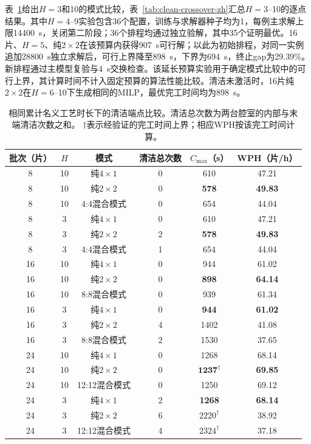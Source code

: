 \documentclass[final,5p,times,twocolumn]{elsarticle}
\begin{document}
表~\ref{tab:mode-extended-zh}给出$H=3$和10的模式比较，表~\ref{tab:clean-crossover-zh}汇总$H=3$--10的逐点结果。其中$H=4$--9实验包含36个配置，训练与求解器种子均为1，每例主求解上限14400~s，关闭第二阶段；36个排程均通过独立验解，其中35个证明最优。16片、$H=5$、纯$2\times2$在该预算内获得907~s可行解；以此为初始排程，对同一实例追加28800~s独立求解后，可行上界降至898~s，下界为694~s，终止gap为29.39\%。新排程通过主模型复验与4~s交换检查。该延长预算实验用于确定模式比较中的可行上界，其计算时间不计入固定预算的算法性能比较。清洁未激活时，16片纯$2\times2$在$H=6$--10下生成相同的MILP，最优完工时间均为898~s。

\begin{table}[!htbp]
\centering
\scriptsize
\setlength{\tabcolsep}{4pt}
\caption{相同累计名义工艺时长下的清洁端点比较。清洁总次数为两台腔室的内部与末端清洁次数之和。 $\dagger$表示经验证的完工时间上界；相应WPH按该完工时间计算。}
\label{tab:mode-extended-zh}
\begin{tabular}{cccccc}
\toprule
批次（片） & $H$ & 模式 & 清洁总次数 & $C_{\max}$（s） & WPH（片/h）\\
\midrule
8 & 10 & 纯$4\times1$ & 0 & 610 & 47.21\\
8 & 10 & 纯$2\times2$ & 0 & \textbf{578} & \textbf{49.83}\\
8 & 10 & 4:4混合模式 & 0 & 654 & 44.04\\
8 & 3 & 纯$4\times1$ & 0 & 610 & 47.21\\
8 & 3 & 纯$2\times2$ & 2 & \textbf{578} & \textbf{49.83}\\
8 & 3 & 4:4混合模式 & 1 & 654 & 44.04\\
\midrule
16 & 10 & 纯$4\times1$ & 0 & 944 & 61.02\\
16 & 10 & 纯$2\times2$ & 0 & \textbf{898} & \textbf{64.14}\\
16 & 10 & 8:8混合模式 & 0 & 939 & 61.34\\
16 & 3 & 纯$4\times1$ & 0 & \textbf{944} & \textbf{61.02}\\
16 & 3 & 纯$2\times2$ & 4 & 1402 & 41.08\\
16 & 3 & 8:8混合模式 & 2 & 1530 & 37.65\\
\midrule
24 & 10 & 纯$4\times1$ & 0 & 1268 & 68.14\\
24 & 10 & 纯$2\times2$ & 0 & $\mathbf{1237}^{\dagger}$ & \textbf{69.85}\\
24 & 10 & 12:12混合模式 & 0 & 1250 & 69.12\\
24 & 3 & 纯$4\times1$ & 2 & \textbf{1268} & \textbf{68.14}\\
24 & 3 & 纯$2\times2$ & 6 & $2220^{\dagger}$ & 38.92\\
24 & 3 & 12:12混合模式 & 4 & $2324^{\dagger}$ & 37.18\\
\bottomrule
\end{tabular}
\end{table}
\end{document}
